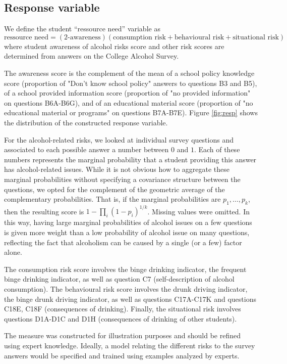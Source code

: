\documentclass[10pt]{amsart}%
\begin{document}
\subsection{Response variable}
\label{sec:resp}

We define the student ``ressource need'' variable as
$$
  \text{ressource need} = (\text{2-awareness}) (\text{consumption risk} + \text{behavioural risk} + \text{situational risk})
$$
where student awareness of alcohol risks score and other risk scores are determined from answers on the College Alcohol Survey. 

The awareness score is the complement of the mean of a school policy knowledge score (proportion of "Don't know school policy" answers to questions B3 and B5), of a school provided information score (proportion of "no provided information" on questions B6A-B6G), and of an educational material score (proportion of "no educational material or programs" on questions B7A-B7E). Figure \ref{fig:resp} shows the distribution of the constructed response variable.

For the alcohol-related risks, we looked at individual survey questions and associated to each possible answer a number between $0$ and $1$. Each of these numbers represents the marginal probability that a student providing this answer has alcohol-related issues. While it is not obvious how to aggregate these marginal probabilities without specifying a covariance structure between the questions, we opted for the complement of the geometric average of the complementary probabilities. That is, if the marginal probabilities are $p_1, \dots, p_k$, then the resulting score is $1-\prod_i (1-p_i)^{1/k}$. Missing values were omitted. In this way, having large marginal probabilities of alcohol issues on a few questions is given more weight than a low probability of alcohol issue on many questions, reflecting the fact that alcoholism can be caused by a single (or a few) factor alone. 

The consumption risk score involves the binge drinking indicator, the frequent binge drinking indicator, as well as question C7 (self-description of alcohol consumption). The behavioural risk score involves the drunk driving indicator, the binge drunk driving indicator, as well as questions C17A-C17K and questions C18E, C18F (consequences of drinking). Finally, the situational risk involves questions D1A-D1C and D1H (consequences of drinking of other students).

The measure was constructed for illustration purposes and should be refined using expert knowledge. Ideally, a model relating the different risks to the survey answers would be specified and trained using examples analyzed by experts.
\end{document}
